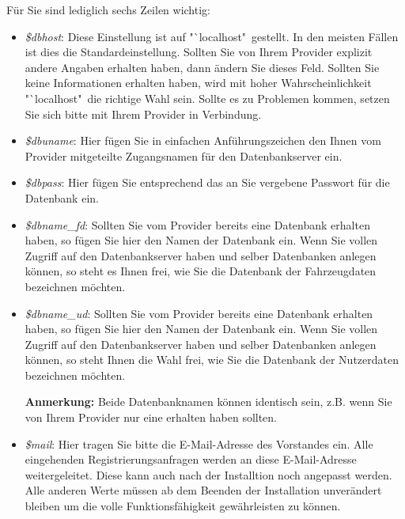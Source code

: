 \documentclass[fontsize = 12pt, paper = a4]{scrreprt}
\begin{document}
\newpage

Für Sie sind lediglich sechs Zeilen wichtig: 

\begin{itemize}[leftmargin=*]

\item \textit{\$dbhost}: Diese Einstellung ist auf "`localhost"\ gestellt. In den meisten Fällen ist dies die Standardeinstellung. Sollten Sie von Ihrem Provider explizit andere Angaben erhalten haben, dann ändern Sie dieses Feld. Sollten Sie keine Informationen erhalten haben, wird mit hoher Wahrscheinlichkeit "`localhost"\ die richtige Wahl sein. Sollte es zu Problemen kommen, setzen Sie sich bitte mit Ihrem Provider in Verbindung.


\item \textit{\$dbuname}: Hier fügen Sie in einfachen Anführungszeichen den Ihnen vom Provider mitgeteilte Zugangsnamen für den Datenbankserver ein.


\item \textit{\$dbpass}: Hier fügen Sie entsprechend das an Sie vergebene Passwort für die Datenbank ein.

\item \textit{\$dbname\_fd}: Sollten Sie vom Provider bereits eine Datenbank erhalten haben, so fügen Sie hier den Namen der Datenbank ein. Wenn Sie vollen Zugriff auf den Datenbankserver haben und selber Datenbanken anlegen können, so steht es Ihnen frei, wie Sie die Datenbank der Fahrzeugdaten bezeichnen möchten.


\item \textit{\$dbname\_ud}: Sollten Sie vom Provider bereits eine Datenbank erhalten haben, so fügen Sie hier den Namen der Datenbank ein. Wenn Sie vollen Zugriff auf den Datenbankserver haben und selber Datenbanken anlegen können, so steht Ihnen die Wahl frei, wie Sie die Datenbank der Nutzerdaten bezeichnen möchten.

\textbf{Anmerkung:} Beide Datenbanknamen können identisch sein, z.B. wenn Sie von Ihrem Provider nur eine erhalten haben sollten. 

\item \textit{\$mail}: Hier tragen Sie bitte die E-Mail-Adresse des Vorstandes ein. Alle eingehenden Registrierungsanfragen werden an diese E-Mail-Adresse weitergeleitet. Diese kann auch nach der Installtion noch angepasst werden. Alle anderen Werte müssen ab dem Beenden der Installation unverändert bleiben um die volle Funktionsfähigkeit gewährleisten zu können.

\end{itemize}
\end{document}
